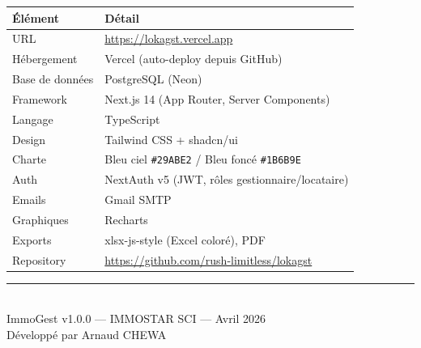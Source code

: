 \documentclass[12pt,a4paper]{article}
\begin{document}
\begin{tabularx}{\textwidth}{lX}
\toprule
\textbf{\'El\'ement} & \textbf{D\'etail} \\
\midrule
URL & \url{https://lokagst.vercel.app} \\
H\'ebergement & Vercel (auto-deploy depuis GitHub) \\
Base de donn\'ees & PostgreSQL (Neon) \\
Framework & Next.js 14 (App Router, Server Components) \\
Langage & TypeScript \\
Design & Tailwind CSS + shadcn/ui \\
Charte & Bleu ciel \texttt{\#29ABE2} / Bleu fonc\'e \texttt{\#1B6B9E} \\
Auth & NextAuth v5 (JWT, r\^oles gestionnaire/locataire) \\
Emails & Gmail SMTP \\
Graphiques & Recharts \\
Exports & xlsx-js-style (Excel color\'e), PDF \\
Repository & \url{https://github.com/rush-limitless/lokagst} \\
\bottomrule
\end{tabularx}

\vfill
\begin{center}
\textcolor{grisTexte}{\rule{0.5\textwidth}{0.4pt}}\\[0.5em]
{\small\textcolor{grisTexte}{ImmoGest v1.0.0 --- IMMOSTAR SCI --- Avril 2026}}\\
{\small\textcolor{grisTexte}{D\'evelopp\'e par Arnaud CHEWA}}
\end{center}
\end{document}
